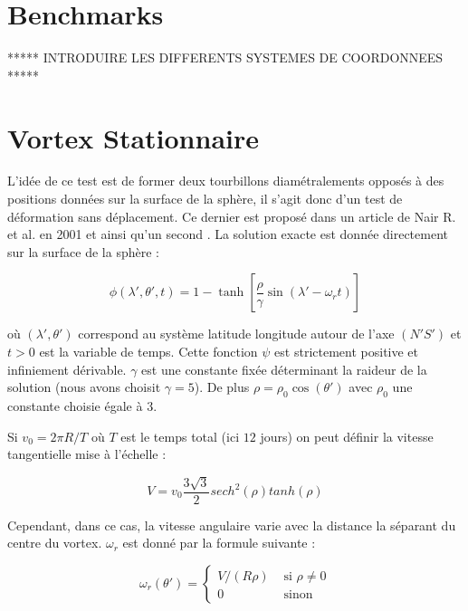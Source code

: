 \section{Benchmarks}

***** INTRODUIRE LES DIFFERENTS SYSTEMES DE COORDONNEES *****

\section{Vortex Stationnaire}

L'idée de ce test est de former deux tourbillons diamétralements opposés à des positions données sur la surface de la sphère, il s'agit donc d'un test de déformation sans déplacement. Ce dernier est proposé dans un article de Nair R. et al. en 2001 \cite{Nair2001} et ainsi qu'un second \cite{Nair1999}.
La solution exacte est donnée directement sur la surface de la sphère :

\begin{equation}
\phi ( \lambda' , \theta', t ) = 1 - \tanh \left[ \dfrac{\rho}{\gamma} \sin ( \lambda' - \omega_r t ) \right]
\label{NM_exacte}
\end{equation}

où $( \lambda' , \theta' )$ correspond au système latitude longitude autour de l'axe $(N'S')$ et $t>0$ est la variable de temps. Cette fonction $\psi$ est strictement positive et infiniement dérivable. $\gamma$ est une constante fixée déterminant la raideur de la solution (nous avons choisit $\gamma = 5$). De plus $\rho = \rho_0 \cos ( \theta' )$ avec $\rho_0$ une constante choisie égale à $3$.

Si $v_0 = 2 \pi R / T$ où $T$ est le temps total (ici $12$ jours) on peut définir la vitesse tangentielle mise à l'échelle :

\begin{equation}
V = v_0 \dfrac{3 \sqrt{3} }{2} sech^2 ( \rho ) tanh ( \rho )
\end{equation} 

Cependant, dans ce cas, la vitesse angulaire varie avec la distance la séparant du centre du vortex. $\omega_r$ est donné par la formule suivante :

\begin{equation}
   \omega_r ( \theta' ) = \left\{ 
   \begin{array}{ll}
      V/( R \rho ) & \text{ si } \rho \neq 0 \\
      0 & \text{ sinon }
   \end{array}
   \right.
\label{vitesse_angulaire}
\end{equation}

